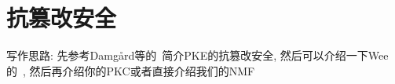 \section{抗篡改安全}
写作思路: 先参考Damg{\aa}rd等的~\cite{DFMV-ASIACRYPT-2013}简介PKE的抗篡改安全, 
然后可以介绍一下Wee的~\cite{Wee-PKC-2012}, 然后再介绍你的PKC或者直接介绍我们的NMF